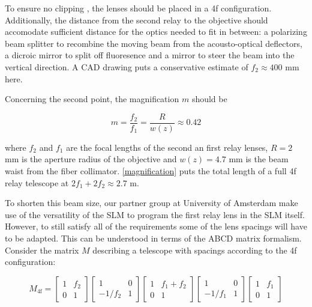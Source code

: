 To ensure no clipping \cite{Nogrette2014}, the lenses should be placed in a 4f configuration. Additionally, the distance from the second relay to the objective should accomodate sufficient distance for the optics needed to fit in between: a polarizing beam splitter to recombine the moving beam from the acousto-optical deflectors, a dicroic mirror to split off fluoresence and a mirror to steer the beam into the vertical direction. A CAD drawing puts a conservative estimate of $f_2 \approx 400$ mm here.

Concerning the second point, the magnification $m$ should be 

\begin{equation}\label{magnification}
    m = \frac{f_2}{f_1}= \frac{R}{w(z)} \approx 0.42
\end{equation}

where $f_2$ and $f_1$ are the focal lengths of the second an first relay lenses, $R = 2$ mm is the aperture radius of the objective and $w(z) = 4.7$ mm is the beam waist from the fiber collimator. \cref{magnification} puts the total length of a full 4f relay telescope at $2f_1+2f_2 \approx 2.7$ m. 

To shorten this beam size, our partner group at University of Amsterdam make use of the versatility of the SLM to program the first relay lens in the SLM itself. However, to still satisfy all of the requirements some of the lens spacings will have to be adapted. This can be understood in terms of the ABCD matrix formalism. Consider the matrix $M$ describing a telescope with spacings according to the 4f configuration: 

\begin{equation}\label{ABCD_telescope}
    M_{4\text{f}} = 
    \begin{bmatrix}
        1 & f_2\\
        0 & 1
    \end{bmatrix}
    \begin{bmatrix}
        1 & 0\\
        -1/f_2 & 1
    \end{bmatrix}
    \begin{bmatrix}
        1 & f_1+f_2\\
        0 & 1
    \end{bmatrix}
    \begin{bmatrix}
        1 & 0 \\
        -1/f_1 & 1
    \end{bmatrix}
    \begin{bmatrix}
        1 & f_1 \\
        0 & 1
    \end{bmatrix} 
\end{equation}

